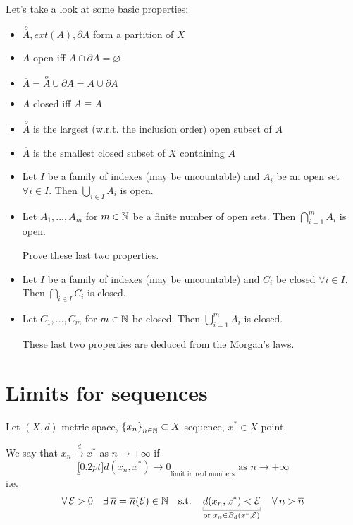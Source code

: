 Let's take a look at some basic properties:
\begin{itemize}
    \item $\overset{o}{A},ext(A),\partial A$ form a partition of $X$
    \item $A$ open iff $A\cap\partial A=\varnothing$
    \item $\overline{A}=\overset{o}{A}\cup\partial A = A\cup\partial A$
    \item $A$ closed iff $A\equiv \overline{A}$
    \item $\overset{o}{A}$ is the largest (w.r.t. the inclusion order) open subset of $A$
    \item $\overline{A}$ is the smallest closed subset of $X$ containing $A$
    \item Let $I$ be a family of indexes (may be uncountable) and $A_i$ be an open set $\forall i\in I$. Then $\displaystyle\bigcup_{i\in I} A_i$ is open.
    \item Let $A_1,...,A_m$ for $m\in\mathbb{N}$ be a finite number of open sets. Then $\displaystyle\bigcap_{i=1}^m A_i$ is open.
    \begin{home}
    Prove these last two properties.
    \end{home}
    \item Let $I$ be a family of indexes (may be uncountable) and $C_i$ be closed $\forall i\in I$. Then $\displaystyle\bigcap_{i\in I} C_i$ is closed.
    \item Let $C_1,...,C_m$ for $m\in\mathbb{N}$ be closed. Then $\displaystyle\bigcup_{i=1}^m A_i$ is closed.
    \begin{subtle}
    These last two properties are deduced from the Morgan's laws.
    \end{subtle}
\end{itemize}


\section{Limits for sequences} %
\label{sec:limits_for_sequences}

Let $(X,d)$ metric space, $\left\{ x_n \right\}_{n\in\mathbb{N}}\subset X$ sequence, $x^*\in X$ point.

\begin{defn}
We say that $x_n\overset{d}\longrightarrow x^*$ as $n\to+\infty$ if
\begin{equation*}
\underbracket[0.2pt]{d(x_n,x^*)\to0}_{\text{limit in real numbers}}\text{ as }n\to+\infty
\end{equation*}
i.e.
\begin{equation*}
\forall\Ec>0\quad\exists \overline{n}=\overline{n}(\Ec)\in\NN\quad\text{s.t.}\quad \underbracket[0.2pt]{d(x_n,x^*)<\Ec}_{\text{or }x_n\in B_d(x^*,\Ec)}\quad \forall n>\overline{n}
\end{equation*}
\end{defn}

